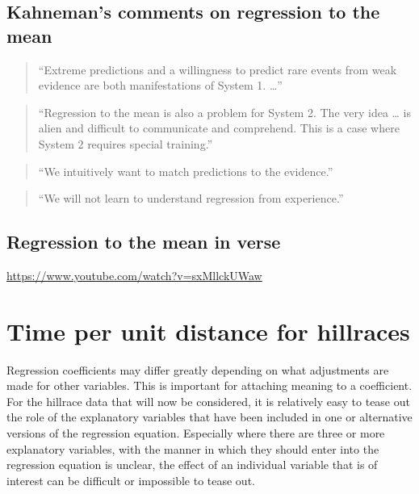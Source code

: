 \documentclass[
  10ptls,
  b5paper]{book}
\begin{document}
\hypertarget{kahnemans-comments-on-regression-to-the-mean}{%
\subsection*{Kahneman's comments on regression to the mean}\label{kahnemans-comments-on-regression-to-the-mean}}

\begin{quote}
``Extreme predictions and a willingness to predict rare events from weak evidence are both manifestations of System 1. \ldots{}''
\end{quote}

\begin{quote}
``Regression to the mean is also a problem for System 2. The very idea \ldots{} is alien and difficult to communicate and comprehend. This is a case where System 2 requires special training.''
\end{quote}

\begin{quote}
``We intuitively want to match predictions to the evidence.''
\end{quote}

\begin{quote}
``We will not learn to understand regression from experience.''
\end{quote}

\hypertarget{regression-to-the-mean-in-verse}{%
\subsection*{Regression to the mean in verse}\label{regression-to-the-mean-in-verse}}

\url{https://www.youtube.com/watch?v=sxMllckUWaw}

\hypertarget{time-per-unit-distance-for-hillraces}{%
\section{Time per unit distance for hillraces}\label{time-per-unit-distance-for-hillraces}}

Regression coefficients may differ greatly depending on what adjustments are made for other variables. This is important for attaching meaning to a coefficient. For the hillrace data that will now be considered, it is relatively easy to tease out the role of the explanatory variables that have been included in one or alternative versions of the regression equation. Especially where there are three or more explanatory variables, with the manner in which they should enter into the regression equation is unclear, the effect of an individual variable that is of interest can be difficult or impossible to tease out.
\end{document}
